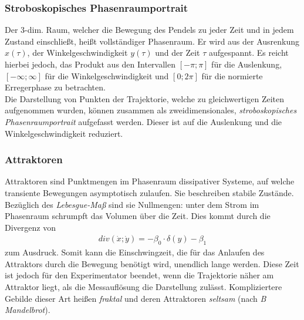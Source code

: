 \documentclass[numbers=noenddot,12pt,a4paper]{scrartcl}
\newcommand{\tilt}[1]{\textit{#1}}
\newcommand{\divergenz}[1]{\textit{div}\left(#1\right)}
\begin{document}
\subsubsection{Stroboskopisches Phasenraumportrait} \label{sec:strobo}
Der 3-dim. Raum, welcher die Bewegung des Pendels zu jeder Zeit und in jedem Zustand einschlie{\ss}t, hei{\ss}t vollst\"andiger Phasenraum. Er wird aus  der Ausrenkung $x(\tau)$, der Winkelgeschwindigkeit $y(\tau)$ und der Zeit $\tau$ aufgespannt.  Es reicht hierbei jedoch, das Produkt aus den Intervallen $\left[-\pi;\pi\right]$ f\"ur die Auslenkung, $\left[-\infty;\infty\right]$ f\"ur die Winkelgeschwindigkeit und $\left[0;2\pi\right]$ f\"ur die normierte Erregerphase zu betrachten. \\
Die Darstellung von Punkten der Trajektorie, welche zu gleichwertigen Zeiten aufgenommen wurden, k\"onnen zusammen als zweidimensionales, \tilt{stroboskopisches Phasenraumportrait} aufgefasst werden. Dieser ist auf die Auslenkung und die Winkelgeschwindigkeit reduziert.
\subsubsection{Attraktoren}
Attraktoren sind Punktmengen im Phasenraum dissipativer Systeme, auf welche transiente Bewegungen asymptotisch zulaufen. Sie beschreiben stabile Zust\"ande. Bez\"uglich des \tilt{Lebesgue-Ma{\ss}} sind sie Nullmengen: unter dem Strom im Phasenraum schrumpft das Volumen \"uber die Zeit. Dies kommt durch die Divergenz von
\begin{align}
\divergenz{\dot x; \dot y}=-\beta_{0}\cdot\delta\left(y\right)-\beta_{1}
\end{align}
zum Ausdruck. Somit kann die Einschwingzeit, die f\"ur das Anlaufen des Attraktors durch die Bewegung ben\"otigt wird, unendlich lange werden. Diese Zeit ist jedoch f\"ur den Experimentator beendet, wenn die Trajektorie n\"aher am Attraktor liegt, als die Messaufl\"osung die Darstellung zul\"asst. Kompliziertere Gebilde dieser Art hei{\ss}en \tilt{fraktal} und deren Attraktoren \tilt{seltsam} (nach \tilt{B Mandelbrot}).
\end{document}
